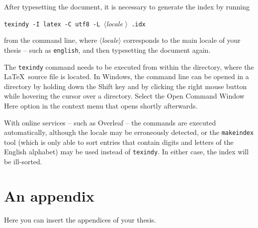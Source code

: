 \documentclass[
  digital,     %
  twoside,     %
  lof,         %
  lot,         %
]{fithesis4}
\begin{document}
After typesetting the document, it is necessary to generate the
index by running
\begin{center}%
  \texttt{texindy -I latex -C utf8 -L }$\langle$\textit{locale}%
  $\rangle$\texttt{ \jobname.idx}
\end{center}
from the command line, where $\langle$\textit{locale}$\rangle$
corresponds to the main locale of your thesis -- such as
\texttt{english}, and then typesetting the document again.

The \texttt{texindy} command needs to be executed from within the
directory, where the \LaTeX\ source file is located. In Windows,
the command line can be opened in a directory by holding down the
\textsf{Shift} key and by clicking the right mouse button while
hovering the cursor over a directory. Select the \textsf{Open Command
Window Here} option in the context menu that opens shortly
afterwards.

With online services -- such as Overleaf -- the commands are
executed automatically, although the locale may be erroneously
detected, or the \texttt{makeindex} tool (which is only able to
sort entries that contain digits and letters of the English
alphabet) may be used instead of \texttt{texindy}. In either case,
the index will be ill-sorted.

  \makeatletter\thesis@blocks@clear\makeatother
  \printindex

\makeatletter
  \thesis@postamble %
\makeatother

\appendix %
\chapter{An appendix}
Here you can insert the appendices of your thesis.
\end{document}
